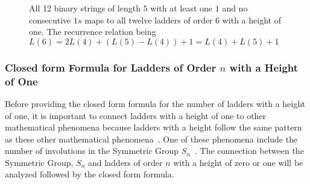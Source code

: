 \begin{center}
\begin{figure}[!htp]
\begin{minipage}{.4\textwidth}
    \end{minipage}

    \caption{All 12 binary strings of length $5$ with at least one $1$ and no consecutive $1s$ maps to all twelve ladders of order $6$ with a height of one. 
    The recurrence relation being $L(6)=2L(4)+(L(5)-L(4))+1=L(4)+L(5)+1$}
    \label{Fig:MapBinToLadder}
\end{figure}
\end{center}



\subsubsection{Closed form Formula for Ladders of Order $n$ with a Height of One}
Before providing the closed form formula for the number of ladders with a height of one, it is important to connect ladders with a height of one 
to other mathematical phenomena because ladders with a height follow the same pattern as these other mathematical phenomena~\cite{A12}.
One of these phenomena include the number of involutions in the Symmetric Group $S_{n}$~\cite{A13}. 
The connection between the Symmetric Group, $S_{n}$ and ladders of order $n$ with a height 
of zero or one will be analyzed followed by the closed form formula.\par 

